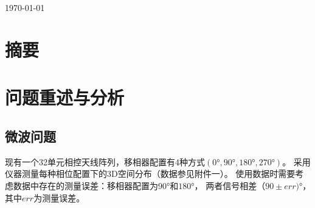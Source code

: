 \documentclass[UTF8,12pt]{ctexart}
\begin{document}
\begin{titlepage}  %
    \centering
    \\

    \\

    {\today}
\end{titlepage}
    



\tableofcontents



\section{摘要}




\section{问题重述与分析}
    \subsection{微波问题}
    现有一个32单元相控天线阵列，移相器配置有4种方式$(0°,90°,180°,270°)$。
    采用仪器测量每种相位配置下的3D空间分布（数据参见附件一）。
    使用数据时需要考虑数据中存在的测量误差：移相器配置为$90°$和$180°$，
    两者信号相差$（90±err)°$，其中$err$为测量误差。
\end{document}
